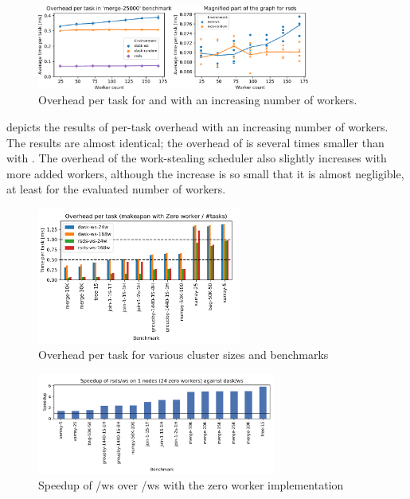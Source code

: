 \begin{figure}
	\centering
	\includegraphics[width=0.8\textwidth]{./imgs/rsds/charts/rsds-merge-worker-scaling}
	\caption{Overhead per task for \rsds{} and \dask{} with an
	increasing number of workers.}
	\label{fig:rsds-merge-worker-scaling}
\end{figure}

 depicts the results of per-task overhead with an increasing
number of workers. The results are almost identical; the overhead of \rsds{} is
several times smaller than with \dask{}. The overhead of the work-stealing
scheduler also slightly increases with more added workers, although the increase is so small that
it is almost negligible, at least for the evaluated number of workers.

\begin{figure}[h]
	\centering
	\includegraphics[width=0.6\textwidth]{./imgs/rsds/charts/rsds-dask-overhead-all}
	\caption{Overhead per task for various cluster sizes and benchmarks}
	\label{fig:rsds-dask-overhead-all}
\end{figure}

\begin{figure}[h]
	\centering
	\includegraphics[width=0.7\textwidth]{./imgs/rsds/charts/speedup-zw-rsds-ws-1}
	\caption{Speedup of \rsds{}/ws over \dask{}/ws with the zero worker
	implementation}
	\label{fig:rsds-zero-worker-speedup}
\end{figure}

